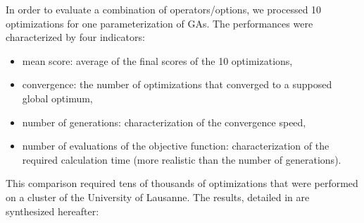 \documentclass[twocol]{ametsoc}
\begin{document}
In order to evaluate a combination of operators/options, we processed 10 optimizations for one parameterization of GAs. The performances were characterized by four indicators:

\begin{itemize}
	\item mean score: average of the final scores of the 10 optimizations,
	\item convergence: the number of optimizations that converged to a supposed global optimum,
	\item number of generations: characterization of the convergence speed,
	\item number of evaluations of the objective function: characterization of the required calculation time (more realistic than the number of generations).
\end{itemize}

This comparison required tens of thousands of optimizations that were performed on a cluster of the University of Lausanne. The results, detailed in \citet{Horton2012a} are synthesized hereafter:
\end{document}
